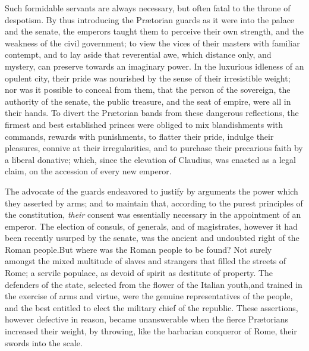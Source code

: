 Such formidable servants are always necessary, but often fatal to
the throne of despotism. By thus introducing the Prætorian guards
as it were into the palace and the senate, the emperors taught
them to perceive their own strength, and the weakness of the
civil government; to view the vices of their masters with
familiar contempt, and to lay aside that reverential awe, which
distance only, and mystery, can preserve towards an imaginary
power. In the luxurious idleness of an opulent city, their pride
was nourished by the sense of their irresistible weight; nor was
it possible to conceal from them, that the person of the
sovereign, the authority of the senate, the public treasure, and
the seat of empire, were all in their hands. To divert the
Prætorian bands from these dangerous reflections, the firmest and
best established princes were obliged to mix blandishments with
commands, rewards with punishments, to flatter their pride,
indulge their pleasures, connive at their irregularities, and to
purchase their precarious faith by a liberal donative; which,
since the elevation of Claudius, was enacted as a legal claim, on
the accession of every new emperor.\footnotemark[6]


The advocate of the guards endeavored to justify by arguments the
power which they asserted by arms; and to maintain that,
according to the purest principles of the constitution, \textit{their}
consent was essentially necessary in the appointment of an
emperor. The election of consuls, of generals, and of
magistrates, however it had been recently usurped by the senate,
was the ancient and undoubted right of the Roman people.\footnotemark[7] But
where was the Roman people to be found? Not surely amongst the
mixed multitude of slaves and strangers that filled the streets
of Rome; a servile populace, as devoid of spirit as destitute of
property. The defenders of the state, selected from the flower of
the Italian youth,\footnotemark[8] and trained in the exercise of arms and
virtue, were the genuine representatives of the people, and the
best entitled to elect the military chief of the republic. These
assertions, however defective in reason, became unanswerable when
the fierce Prætorians increased their weight, by throwing, like
the barbarian conqueror of Rome, their swords into the scale.\footnotemark[9]

